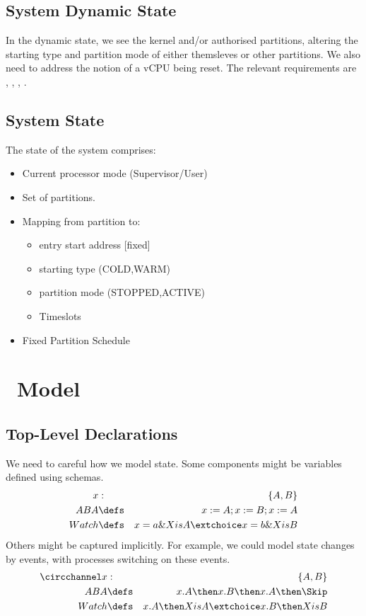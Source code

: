 \subsection{System Dynamic State}

In the dynamic state, we see the kernel and/or authorised partitions,
altering the starting type and partition mode of either themsleves
or other partitions.
We also need to address the notion of a vCPU being reset.
The relevant requirements are , , , .

\subsection{System State}

The state of the system comprises:
\begin{itemize}
  \item Current processor mode (Supervisor/User)
  \item Set of partitions.
  \item Mapping from partition to:
    \begin{itemize}
      \item entry start address [fixed]
      \item starting type (COLD,WARM)
      \item partition mode (STOPPED,ACTIVE)
      \item Timeslots
    \end{itemize}
  \item Fixed Partition Schedule
\end{itemize}

\section{\Circus\ Model}

\subsection{Top-Level Declarations}

We need to careful how we model state.
Some components might be variables defined using schemas.
\begin{eqnarray*}
   x &:& \{A,B\}
\\ ABA &\defs& x := A ; x:= B ; x := A
\\ Watch &\defs& x = a \& XisA \extchoice x = b \& XisB
\end{eqnarray*}
Others might be captured implicitly.
For example, we could model state changes by events,
with processes switching on these events.
\begin{eqnarray*}
   \circchannel x &:& \{A,B\}
\\ ABA &\defs&  x.A \then x.B \then x.A \then \Skip
\\ Watch &\defs& x.A \then XisA \extchoice x.B \then XisB
\end{eqnarray*}

